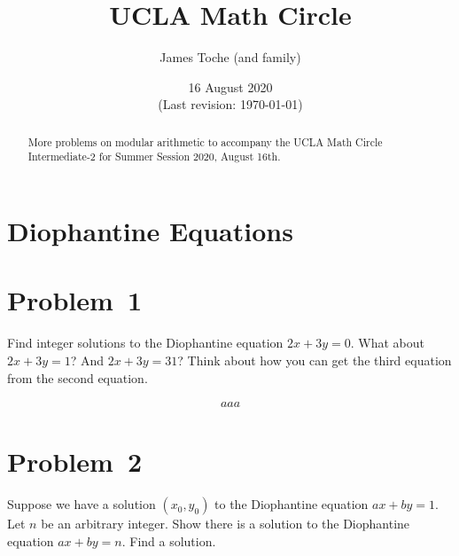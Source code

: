 \documentclass[12pt]{article}
\title{UCLA Math Circle}
\author{James Toche (and family)}
\date{16 August 2020 \\(Last revision: \today)}
\begin{document}
\begin{minipage}{\textwidth}
\maketitle
\begin{abstract}
More problems on modular arithmetic to accompany the UCLA Math Circle Intermediate-2 for Summer Session 2020, August 16th. 
\end{abstract}
\end{minipage}


\section*{Diophantine Equations}

\section*{Problem~1}
\begin{question}
Find integer solutions to the Diophantine equation $2x+3y = 0$. What about $2x+3y = 1$? And $2x+3y = 31$? Think about how you can get the third equation from the second equation.
\end{question}

\begin{align*}
aaa
\end{align*}


\section*{Problem~2}
\begin{question}
Suppose we have a solution $(x_{0},y_{0})$ to the Diophantine equation $ax+by=1$. Let $n$ be an arbitrary integer. Show there is a solution to the Diophantine equation $ax+by=n$. Find a solution.
\end{question}
\end{document}
